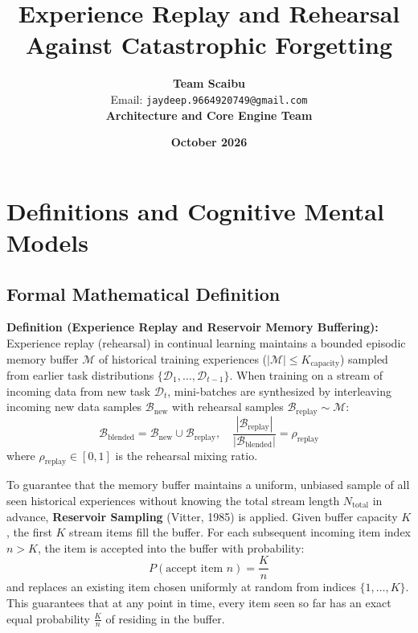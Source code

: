 \documentclass[11pt,a4paper]{article}
\title{\textbf{Experience Replay and Rehearsal Against Catastrophic Forgetting}}
\author{\textbf{Team Scaibu} \\ \small Email: \texttt{jaydeep.9664920749@gmail.com} \\ \small \textbf{Architecture and Core Engine Team}}
\date{\textbf{October 2026}}
\theoremstyle{definition}
\begin{document}
\maketitle

\section{Definitions and Cognitive Mental Models}

\subsection{Formal Mathematical Definition}
\textbf{Definition (Experience Replay and Reservoir Memory Buffering):}
Experience replay (rehearsal) in continual learning maintains a bounded episodic memory buffer $\mathcal{M}$ of historical training experiences ($|\mathcal{M}| \le K_{\text{capacity}}$) sampled from earlier task distributions $\{\mathcal{D}_1, \dots, \mathcal{D}_{t-1}\}$. When training on a stream of incoming data from new task $\mathcal{D}_t$, mini-batches are synthesized by interleaving incoming new data samples $\mathcal{B}_{\text{new}}$ with rehearsal samples $\mathcal{B}_{\text{replay}} \sim \mathcal{M}$:
{\boldmath
\begin{equation}
\mathcal{B}_{\text{blended}} = \mathcal{B}_{\text{new}} \cup \mathcal{B}_{\text{replay}}, \quad \frac{|\mathcal{B}_{\text{replay}}|}{|\mathcal{B}_{\text{blended}}|} = \rho_{\text{replay}}
\end{equation}
}
where $\rho_{\text{replay}} \in [0, 1]$ is the rehearsal mixing ratio.

To guarantee that the memory buffer maintains a uniform, unbiased sample of all seen historical experiences without knowing the total stream length $N_{\text{total}}$ in advance, \textbf{Reservoir Sampling} (Vitter, 1985) is applied. Given buffer capacity $K$, the first $K$ stream items fill the buffer. For each subsequent incoming item index $n > K$, the item is accepted into the buffer with probability:
{\boldmath
\begin{equation}
P(\text{accept item } n) = \frac{K}{n}
\end{equation}
}
and replaces an existing item chosen uniformly at random from indices $\{1, \dots, K\}$. This guarantees that at any point in time, every item seen so far has an exact equal probability $\frac{K}{n}$ of residing in the buffer.
\end{document}
